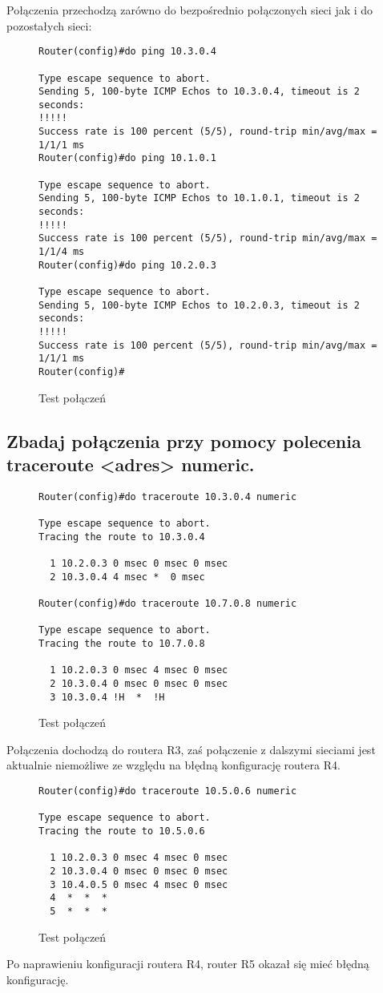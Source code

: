 \documentclass[polish, a4paper]{article}
\begin{document}
Połączenia przechodzą zarówno do bezpośrednio połączonych sieci jak i do pozostałych sieci:

\begin{figure}[H]
\begin{verbatim}
Router(config)#do ping 10.3.0.4

Type escape sequence to abort.
Sending 5, 100-byte ICMP Echos to 10.3.0.4, timeout is 2 seconds:
!!!!!
Success rate is 100 percent (5/5), round-trip min/avg/max = 1/1/1 ms
Router(config)#do ping 10.1.0.1

Type escape sequence to abort.
Sending 5, 100-byte ICMP Echos to 10.1.0.1, timeout is 2 seconds:
!!!!!
Success rate is 100 percent (5/5), round-trip min/avg/max = 1/1/4 ms
Router(config)#do ping 10.2.0.3

Type escape sequence to abort.
Sending 5, 100-byte ICMP Echos to 10.2.0.3, timeout is 2 seconds:
!!!!!
Success rate is 100 percent (5/5), round-trip min/avg/max = 1/1/1 ms
Router(config)#
\end{verbatim}
\caption{Test połączeń}
\end{figure}

\subsection{Zbadaj połączenia przy pomocy polecenia traceroute <adres> numeric.}

\begin{figure}[H]
\begin{verbatim}
Router(config)#do traceroute 10.3.0.4 numeric

Type escape sequence to abort.
Tracing the route to 10.3.0.4

  1 10.2.0.3 0 msec 0 msec 0 msec
  2 10.3.0.4 4 msec *  0 msec

Router(config)#do traceroute 10.7.0.8 numeric

Type escape sequence to abort.
Tracing the route to 10.7.0.8

  1 10.2.0.3 0 msec 4 msec 0 msec
  2 10.3.0.4 0 msec 0 msec 0 msec
  3 10.3.0.4 !H  *  !H 

\end{verbatim}
\caption{Test połączeń}
\end{figure}

Połączenia dochodzą do routera R3, zaś połączenie z dalszymi sieciami jest aktualnie niemożliwe ze względu na błędną konfigurację routera R4.

\begin{figure}[H]
\begin{verbatim}
Router(config)#do traceroute 10.5.0.6 numeric

Type escape sequence to abort.
Tracing the route to 10.5.0.6

  1 10.2.0.3 0 msec 4 msec 0 msec
  2 10.3.0.4 0 msec 0 msec 0 msec
  3 10.4.0.5 0 msec 4 msec 0 msec
  4  *  *  * 
  5  *  *  * 
\end{verbatim}
\caption{Test połączeń}
\end{figure}

Po naprawieniu konfiguracji routera R4, router R5 okazał się mieć błędną konfigurację.
\end{document}
